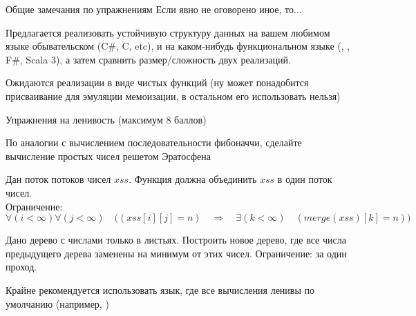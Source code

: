 \newcommand\exscore[3]{#1/#2/#3}


\begin{frame}{Общие замечания по упражнениям}
Если явно не оговорено иное, то...
\vspace{2em}

Предлагается реализовать устойчивую структуру данных на вашем любимом языке обывательском (C\#, C, etc), и на каком-нибудь функциональном языке (\OCaml{}, \Haskell{}, F\#, Scala 3), а затем сравнить размер/сложность двух реализаций.

Ожидаются реализации в виде чистых функций (ну может понадобится присваивание для эмуляции мемоизации, в остальном его использовать нельзя)
\vspace{2em}

\end{frame}



\begin{frame}[allowframebreaks]{Упражнения на ленивость (максимум 8 баллов)}
\begin{exercise}[2 балла]
По аналогии с вычислением последовательности фибоначчи, сделайте вычисление простых чисел решетом Эратосфена
\end{exercise}

\begin{exercise}[2 балла]
Дан поток потоков чисел $xss$. Функция  должна объединить $xss$ в один поток чисел. \\
Ограничение: $\forall (i<\infty) \forall (j<\infty)\quad \big((xss[i][j]= n)\quad \Longrightarrow \quad\exists (k<\infty)\quad (merge(xss)[k]= n)\big)$
\end{exercise}

\begin{exercise}[4 балла]
Дано дерево с числами только в листьях. Построить новое дерево, где все числа предыдущего дерева заменены на минимум от этих чисел. Ограничение: за один проход.
\begin{remark}
Крайне рекомендуется использовать язык, где все вычисления ленивы по умолчанию (например, \Haskell)
\end{remark}
\end{exercise}
\end{frame}




